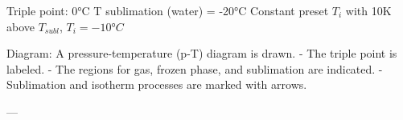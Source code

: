 Triple point: 0°C  
T sublimation (water) = -20°C  
Constant preset \( T_i \) with 10K above \( T_{subl} \), \( T_i = -10°C \)  

Diagram:  
A pressure-temperature (p-T) diagram is drawn.  
- The triple point is labeled.  
- The regions for gas, frozen phase, and sublimation are indicated.  
- Sublimation and isotherm processes are marked with arrows.  

---